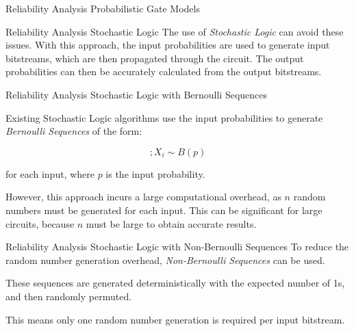 \documentclass[12pt]{beamer}
\begin{document}
\begin{frame}{Reliability Analysis \small Probabilistic Gate Models}
\end{frame}

\begin{frame}{Reliability Analysis \small Stochastic Logic}
The use of \emph{Stochastic Logic} can avoid these issues. With this approach, the input probabilities are used to generate input bitstreams, which are then propagated through the circuit. The output probabilities can then be accurately calculated from the output bitstreams.
\end{frame}

\begin{frame}{Reliability Analysis \small Stochastic Logic with Bernoulli Sequences}

Existing Stochastic Logic algorithms use the input probabilities to generate \emph{Bernoulli Sequences} of the form:

\begin{equation*}
[X_0, X_1 \dots X_{n-1}]; X_i \sim B(p)
\end{equation*}

for each input, where $p$ is the input probability.
\vspace{0.25cm}

However, this approach incurs a large computational overhead, as $n$ random numbers must be generated for each input. This can be significant for large circuits, because $n$ must be large to obtain accurate results.
\end{frame}

\begin{frame}{Reliability Analysis \small Stochastic Logic with Non-Bernoulli Sequences}
To reduce the random number generation overhead, \emph{Non-Bernoulli Sequences} can be used.
\vspace{0.25cm}

These sequences are generated deterministically with the expected number of 1s, and then randomly permuted.
\vspace{0.25cm}

This means only one random number generation is required per input bitstream.
\end{frame}
\end{document}
